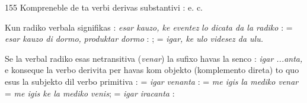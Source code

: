 \begin{VUpage}[159]{155}
Kompreneble de ta verbi derivas substantivi : \nl
{} e. c.

Kun radiko verbala  signifikas : \textit{esar kauzo, ke eventez}\nl
\textit{lo dicata da la radiko} :  = \textit{esar kauzo di dormo,}\nl
\textit{produktar dormo} : ;  =\nl
\textit{igar, ke ulo videsez da ulu.}

Se la verbal radiko esas netransitiva (\textit{venar}) la sufixo \nl
havas la senco : \textit{igar ...anta,} e konseque la verbo derivita\nl
per  havas kom objekto (komplemento direta) to quo\nl
esus la subjekto dil verbo primitiva :  = \textit{igar}\nl
\textit{venanta} :  = \textit{me igis la mediko venar}\nl
= \textit{me igis ke la mediko venis};  = \textit{igar iracanta} : \nl
{}
\end{VUpage}


